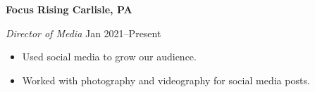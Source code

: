 \textbf{Focus Rising \hfill  Carlisle, PA} \par
\textit{Director of Media} \hfill Jan 2021--Present \par
\begin{itemize}
	\item Used social media to grow our audience.
	\item Worked with photography and videography for social media posts.
\end{itemize} \par
